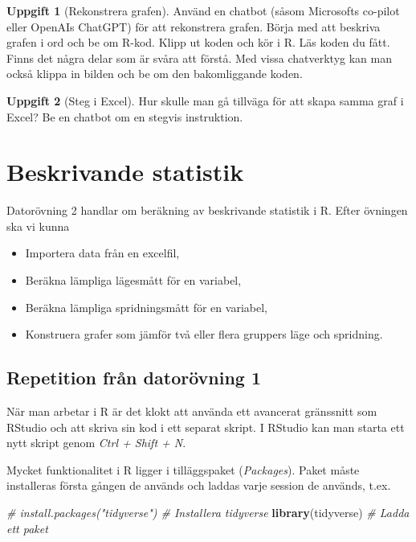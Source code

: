 \documentclass[
]{book}
\newenvironment{Shaded}{\begin{snugshade}}{\end{snugshade}}
\newcommand{\CommentTok}[1]{\textcolor[rgb]{0.56,0.35,0.01}{\textit{#1}}}
\newcommand{\FunctionTok}[1]{\textcolor[rgb]{0.13,0.29,0.53}{\textbf{#1}}}
\newcommand{\NormalTok}[1]{#1}
\providecommand{\tightlist}{%
  \setlength{\itemsep}{0pt}\setlength{\parskip}{0pt}}
\theoremstyle{definition}
\theoremstyle{definition}
\theoremstyle{definition}
\newtheorem{exercise}{Uppgift}[chapter]
\theoremstyle{definition}
\theoremstyle{remark}
\begin{document}
\begin{exercise}[Rekonstrera grafen]
Använd en chatbot (såsom Microsofts co-pilot eller OpenAIs ChatGPT) för att rekonstrera grafen. Börja med att beskriva grafen i ord och be om R-kod. Klipp ut koden och kör i R. Läs koden du fått. Finns det några delar som är svåra att förstå. Med vissa chatverktyg kan man också klippa in bilden och be om den bakomliggande koden.
\end{exercise}

\begin{exercise}[Steg i Excel]
Hur skulle man gå tillväga för att skapa samma graf i Excel? Be en chatbot om en stegvis instruktion.
\end{exercise}

\chapter{Beskrivande statistik}\label{beskrivande-statistik}

Datorövning 2 handlar om beräkning av beskrivande statistik i R. Efter övningen ska vi kunna

\begin{itemize}
\tightlist
\item
  Importera data från en excelfil,
\item
  Beräkna lämpliga lägesmått för en variabel,
\item
  Beräkna lämpliga spridningsmått för en variabel,
\item
  Konstruera grafer som jämför två eller flera gruppers läge och spridning.
\end{itemize}

\section{Repetition från datorövning 1}\label{repetition-fruxe5n-datoruxf6vning-1}

När man arbetar i R är det klokt att använda ett avancerat gränssnitt som RStudio och att skriva sin kod i ett separat skript. I RStudio kan man starta ett nytt skript genom \emph{Ctrl + Shift + N}.

Mycket funktionalitet i R ligger i tilläggspaket (\emph{Packages}). Paket måste installeras första gången de används och laddas varje session de används, t.ex.

\begin{Shaded}
\begin{Highlighting}[]
\CommentTok{\# install.packages("tidyverse") \# Installera tidyverse}
\FunctionTok{library}\NormalTok{(tidyverse)              }\CommentTok{\# Ladda ett paket}
\end{Highlighting}
\end{Shaded}
\end{document}
